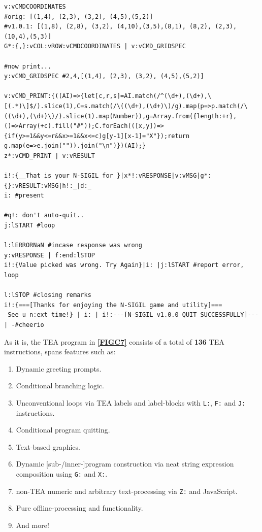 \documentclass[a4paper, 18pt]{book} %
\begin{document}
{\begin{tcolorbox}[teaterminalstyle, title=TEA Program: N-SIGIL image generator program, breakable]
\begin{lstlisting}[language=TEA,breaklines=true]
v:vCMDCOORDINATES
#orig: [(1,4), (2,3), (3,2), (4,5),(5,2)]
#v1.0.1: [(1,8), (2,8), (3,2), (4,10),(3,5),(8,1), (8,2), (2,3), (10,4),(5,3)]
G*:{,}:vCOL:vROW:vCMDCOORDINATES | v:vCMD_GRIDSPEC

#now print...
y:vCMD_GRIDSPEC #2,4,[(1,4), (2,3), (3,2), (4,5),(5,2)]

v:vCMD_PRINT:{((AI)=>{let[c,r,s]=AI.match(/^(\d+),(\d+),\[(.*)\]$/).slice(1),C=s.match(/\((\d+),(\d+)\)/g).map(p=>p.match(/\((\d+),(\d+)\)/).slice(1).map(Number)),g=Array.from({length:+r},()=>Array(+c).fill("#"));C.forEach(([x,y])=>{if(y>=1&&y<=r&&x>=1&&x<=c)g[y-1][x-1]="X"});return g.map(e=>e.join("")).join("\n")})(AI);}
z*:vCMD_PRINT | v:vRESULT

i!:{__That is your N-SIGIL for }|x*!:vRESPONSE|v:vMSG|g*:{}:vRESULT:vMSG|h!:_|d:_
i: #present

#q!: don't auto-quit..
j:lSTART #loop

l:lERRORNaN #incase response was wrong
y:vRESPONSE | f:end:lSTOP
i!:{Value picked was wrong. Try Again}|i: |j:lSTART #report error, loop

l:lSTOP #closing remarks
i!:{===[Thanks for enjoying the N-SIGIL game and utility]===
 See u n:ext time!} | i: | i!:---[N-SIGIL v1.0.0 QUIT SUCCESSFULLY]--- | -#cheerio
   \end{lstlisting}
  \end{tcolorbox}
  \label{FIGC7}
  \vspace{1cm}
  
}
 \raggedright %
  
  As it is, the TEA program in \textbf{\autoref{FIGC7}} consists of a total of \textbf{136} TEA instructions, spans features such as:
  
\begin{enumerate}
\item Dynamic greeting prompts.
\item Conditional branching logic.
\item Unconventional loops via TEA labels and label-blocks with \texttt{L:}, \texttt{F:} and \texttt{J:} instructions.
\item Conditional program quitting.
\item Text-based graphics.
\item Dynamic [sub-/inner-]program construction via neat string expression composition using \texttt{G:} and \texttt{X:}.
\item non-TEA numeric and arbitrary text-processing via \texttt{Z:} and JavaScript.
\item Pure offline-processing and functionality.
\item And more!
\end{enumerate} 
 
\end{document}
